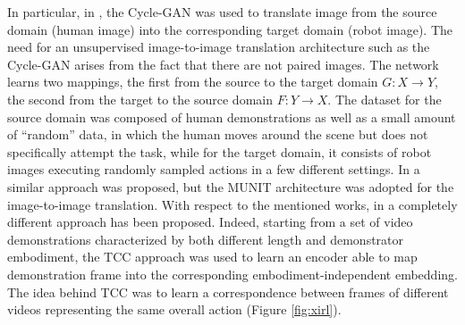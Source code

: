 \newline In particular, in \cite{smith2019avid,li2021meta_watching_video_demonstration}, the Cycle-GAN \cite{zhu2017cycle_gan} was used to translate image from the source domain (human image) into the corresponding target domain (robot image). The need for an unsupervised image-to-image translation architecture such as the Cycle-GAN arises from the fact that there are not paired images. The network learns two mappings, the first from the source to the target domain $G : X \rightarrow Y$, the second from the target to the source domain $F : Y \rightarrow X$. The dataset for the source domain was composed of human demonstrations as well as a small amount of ``random” data, in which the human moves around the scene but does not specifically attempt the task, while for the target domain, it consists of  robot images executing randomly sampled actions in a few different settings. In \cite{xiong2021learning_by_watching} a similar approach was proposed, but the MUNIT \cite{huang2018munit} architecture was adopted for the image-to-image translation. With respect to the mentioned works, in \cite{zakka2022xirl} a completely different approach has been proposed. Indeed, starting from a set of video demonstrations characterized by both different length and demonstrator embodiment, the TCC approach was used to learn an encoder able to map demonstration frame into the corresponding embodiment-independent embedding. The idea behind TCC was to learn a correspondence between frames of different videos representing the same overall action (Figure \ref{fig:xirl}).

